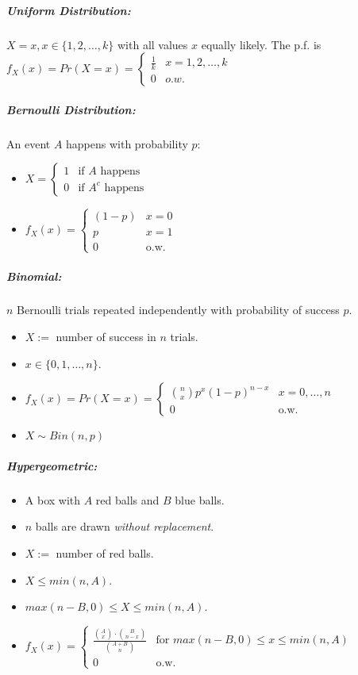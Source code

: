 \documentclass[landscape,10pt]{article}
\begin{document}
\begin{multicols}{3}
    \subparagraph*{Uniform Distribution: }
        $X = x, x \in \{1, 2, \ldots, k\}$ with all values $x$ equally likely. The p.f. is $f_X(x) = Pr(X=x) =  \begin{cases} \frac      {1}{k} & x = 1, 2, \ldots, k \\ 0 & o.w. \end{cases} $

    \subparagraph*{Bernoulli Distribution: }
        An event $A$ happens with probability $p$:
        \begin{itemize}
            \item[] $X = \begin{cases} 1 & \text{if $A$ happens} \\ 0 & \text{if $A^c$ happens} \end{cases} $
            \item[] $f_X(x) =
    \begin{cases} 
    (1-p)   & x = 0 \\ 
    p       & x = 1 \\
    0       & \text{o.w.} 
    \end{cases} $
\end{itemize}

    \subparagraph*{Binomial:}
        $n$ Bernoulli trials repeated independently with probability of success $p$. 
        \begin{itemize}
            \item[] $X :=$ number of success in $n$ trials. 
            \item[] $x \in \{0, 1, \ldots, n\}$. 
            \item[] $f_X(x) = Pr(X=x) =
    \begin{cases}
    {n \choose x} p^x (1-p)^{n-x}   &   x=0, \ldots, n \\
    0                               &   \text{o.w.}
    \end{cases} $
            \item[] $X \sim Bin(n,p)$
        \end{itemize}

    \subparagraph*{Hypergeometric: }
        \begin{itemize}
            \item[] A box with $A$ red balls and $B$ blue balls.
            \item[] $n$ balls are drawn \textit{without replacement}. 
            \item[] $X :=$ number of red balls. 
            \item[] $X \leq min(n, A)$. 
            \item[] $max(n-B, 0) \leq X \leq min(n,A)$. 
            \item[] $f_X(x) =
    \begin{cases}
    \frac{ {A \choose x} \cdot {B \choose n - x}}{{A + B \choose n}}     &   \text{for } max(n-B,0) \leq x \leq min(n,A) \\
    0   &   \text{o.w.}
    \end{cases}
    $
\end{itemize}


\end{multicols}
\end{document}
